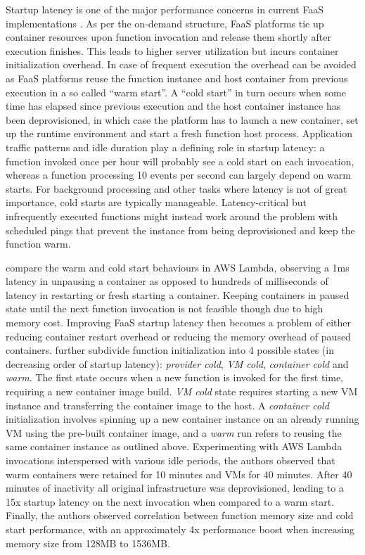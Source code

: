 Startup latency is one of the major performance concerns in current FaaS implementations \parencite{cncf18serverlessWG}. As per the on-demand structure, FaaS platforms tie up container resources upon function invocation and release them shortly after execution finishes. This leads to higher server utilization but incurs container initialization overhead. In case of frequent execution the overhead can be avoided as FaaS platforms reuse the function instance and host container from previous execution in a so called ``warm start''. A ``cold start'' in turn occurs when some time has elapsed since previous execution and the host container instance has been deprovisioned, in which case the platform has to launch a new container, set up the runtime environment and start a fresh function host process. Application traffic patterns and idle duration play a defining role in startup latency: a function invoked once per hour will probably see a cold start on each invocation, whereas a function processing 10 events per second can largely depend on warm starts. For background processing and other tasks where latency is not of great importance, cold starts are typically manageable. Latency-critical but infrequently executed functions might instead work around the problem with scheduled pings that prevent the instance from being deprovisioned and keep the function warm. \parencite{robert2016serverlessarchitectures}

\textcite{hendrickson16openlambda} compare the warm and cold start behaviours in AWS Lambda, observing a 1ms latency in unpausing a container as opposed to hundreds of milliseconds of latency in restarting or fresh starting a container. Keeping containers in paused state until the next function invocation is not feasible though due to high memory cost. Improving FaaS startup latency then becomes a problem of either reducing container restart overhead or reducing the memory overhead of paused containers. \textcite{lloydserverless} further subdivide function initialization into 4 possible states (in decreasing order of startup latency): \textit{provider cold}, \textit{VM cold}, \textit{container cold} and \textit{warm}. The first state occurs when a new function is invoked for the first time, requiring a new container image build. \textit{VM cold} state requires starting a new VM instance and transferring the container image to the host. A \textit{container cold} initialization involves spinning up a new container instance on an already running VM using the pre-built container image, and a \textit{warm} run refers to reusing the same container instance as outlined above. Experimenting with AWS Lambda invocations interspersed with various idle periods, the authors observed that warm containers were retained for 10 minutes and VMs for 40 minutes. After 40 minutes of inactivity all original infrastructure was deprovisioned, leading to a 15x startup latency on the next invocation when compared to a warm start. Finally, the authors observed correlation between function memory size and cold start performance, with an approximately 4x performance boost when increasing memory size from 128MB to 1536MB.

